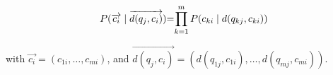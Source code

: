 \documentclass[10pt,a4paper,final]{article}
\begin{document}
\begin{equation}
	\label{eq:joint_third_idea}
	\begin{tabular}{r@{=}l}
		$P(\overrightarrow{c_i} \mid \overrightarrow{d(q_j, c_i)})$ & $\displaystyle \prod_{k=1}^{m} P(c_{ki} \mid d(q_{kj}, c_{ki}))$ \\ 
	\end{tabular}
\end{equation}

\noindent with $\overrightarrow{c_i} = (c_{1i}, \ldots, c_{mi})$, and $\overrightarrow{d(q_j, c_i)} = (d(q_{1j}, c_{1i}), \ldots, d(q_{mj}, c_{mi}))$.
\end{document}
